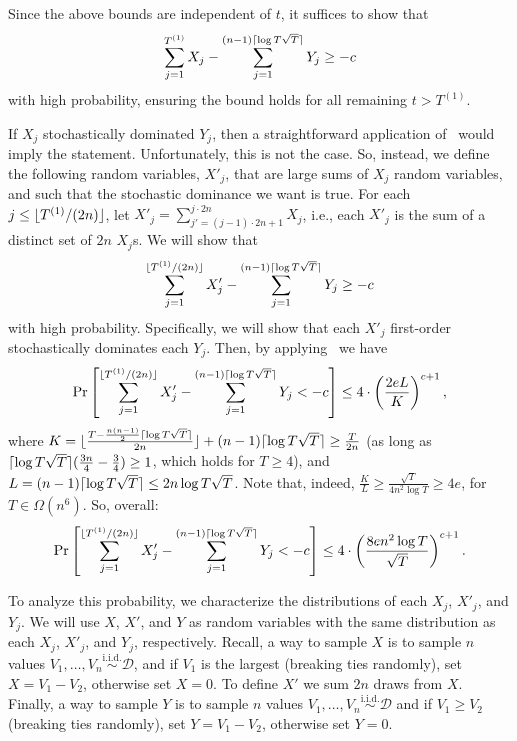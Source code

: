     Since the above bounds are independent of $t$, it suffices to show that $$\sum_{j = 1}^{T^{(1)}} X_j - \sum_{j = 1}^{(n - 1) \lceil\log T \sqrt{T}\rceil} Y_j \ge -c$$  with high probability, ensuring the bound holds for all remaining $t > T^{(1)}$.

    If $X_j$ stochastically dominated $Y_j$, then a straightforward application of~ would imply the statement. Unfortunately, this is not the case. So, instead, we define the following random variables, $X'_j$, that are large sums of $X_j$ random variables, and such that the stochastic dominance we want is true. For each $j \le \lfloor T^{(1)}/(2n)\rfloor$, let $X'_j = \sum_{j' = (j - 1) \cdot 2n + 1}^{j \cdot 2n} X_j$, i.e., each $X'_j$ is the sum of a distinct set of $2n$ $X_j$s. We will show that  $$\sum_{j = 1}^{\lfloor T^{(1)}/(2n)\rfloor} X'_j - \sum_{j = 1}^{(n - 1) \lceil\log T \sqrt{T}\rceil} Y_j \ge -c$$  with high probability.
    Specifically, we will show that each $X'_j$ first-order stochastically dominates each $Y_j$. Then, by applying~ we have 
    \[
    \Pr \left[ \sum_{j = 1}^{\lfloor T^{(1)}/(2n)\rfloor} X'_j - \sum_{j = 1}^{(n - 1) \lceil\log T \sqrt{T}\rceil} Y_j < -c \right] \leq 4 \cdot \left(\frac{2 e L}{K} \right)^{c + 1},
    \]
    where $K = \lfloor\frac{T - \frac{n(n-1)}{2}\lceil\log T \sqrt{T}\rceil}{2n}\rfloor + (n - 1) \lceil\log T \sqrt{T}\rceil \geq \frac{T}{2n}$ (as long as $\lceil\log T \sqrt{T}\rceil(\frac{3n}{4} - \frac{3}{4}) \geq 1$, which holds for $T \geq 4$), and $L = (n - 1) \lceil\log T \sqrt{T}\rceil \leq 2n \log T \sqrt{T}$. Note that, indeed, $\frac{K}{L} \geq \frac{\sqrt{T}}{4 n^2 \log T } \geq 4e$, for $T \in \Omega(n^6)$.
    So, overall:
    \[
    \Pr \left[ \sum_{j = 1}^{\lfloor T^{(1)}/(2n)\rfloor} X'_j - \sum_{j = 1}^{(n - 1) \lceil\log T \sqrt{T}\rceil} Y_j < -c \right] \leq 4 \cdot \left(\frac{8 e n^2 \log T}{\sqrt{T}} \right)^{c + 1}.
    \]


    To analyze this probability, we characterize the distributions of each $X_j$, $X'_j$, and $Y_j$. We will use $X$, $X'$, and $Y$ as random variables with the same distribution as each $X_j$, $X'_j$, and $Y_j$, respectively. Recall, a way to sample $X$ is to sample $n$ values $V_1, \ldots, V_n \stackrel{\text{i.i.d.}}{\sim} \mathcal{D}$, and if $V_1$ is the largest (breaking ties randomly), set $X = V_1 - V_2$, otherwise set $ X = 0$. To define $X'$ we sum $2n$ draws from $X$. Finally, a way to sample $Y$ is to sample $n$ values $V_1, \ldots, V_n \stackrel{\text{i.i.d.}}{\sim} \mathcal{D}$ and if $V_1 \ge V_2$ (breaking ties randomly), set $Y = V_1 - V_2$, otherwise set $Y = 0$.


